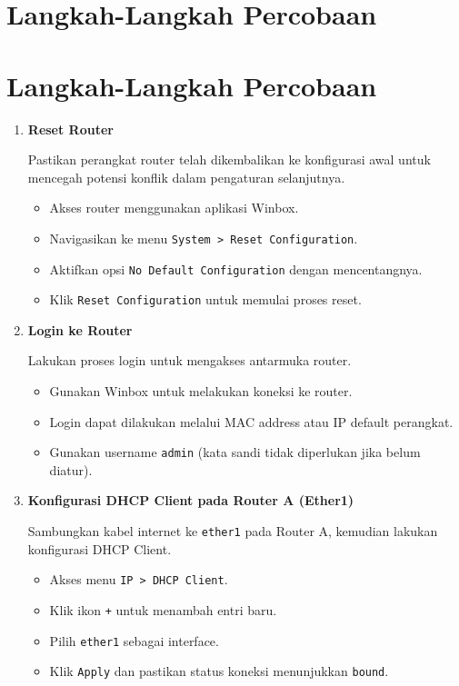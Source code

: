 \section{Langkah-Langkah Percobaan}
\section{Langkah-Langkah Percobaan}

\begin{enumerate}
    \item \textbf{Reset Router}

    Pastikan perangkat router telah dikembalikan ke konfigurasi awal untuk mencegah potensi konflik dalam pengaturan selanjutnya.

    \begin{itemize}
        \item Akses router menggunakan aplikasi Winbox.
        \item Navigasikan ke menu \texttt{System > Reset Configuration}.
        \item Aktifkan opsi \texttt{No Default Configuration} dengan mencentangnya.
        \item Klik \texttt{Reset Configuration} untuk memulai proses reset.
    \end{itemize}

    \item \textbf{Login ke Router}

    Lakukan proses login untuk mengakses antarmuka router.

    \begin{itemize}
        \item Gunakan Winbox untuk melakukan koneksi ke router.
        \item Login dapat dilakukan melalui MAC address atau IP default perangkat.
        \item Gunakan username \texttt{admin} (kata sandi tidak diperlukan jika belum diatur).
    \end{itemize}

    \item \textbf{Konfigurasi DHCP Client pada Router A (Ether1)}

    Sambungkan kabel internet ke \texttt{ether1} pada Router A, kemudian lakukan konfigurasi DHCP Client.

    \begin{itemize}
        \item Akses menu \texttt{IP > DHCP Client}.
        \item Klik ikon \texttt{+} untuk menambah entri baru.
        \item Pilih \texttt{ether1} sebagai interface.
        \item Klik \texttt{Apply} dan pastikan status koneksi menunjukkan \texttt{bound}.
    \end{itemize}


\end{enumerate}
